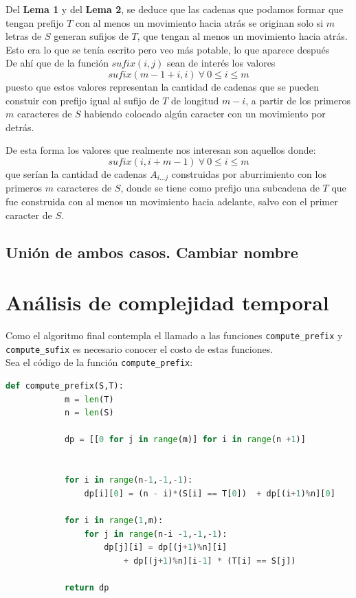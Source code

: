 \documentclass[a4paper]{article}
\begin{document}
	
	
	Del \textbf{Lema 1} y del \textbf{Lema 2}, se deduce que las cadenas que podamos formar que tengan prefijo $T$ con al menos un 
	movimiento hacia atr\'as se originan solo si $m$ letras de $S$ generan sufijos de $T$, que tengan al menos un movimiento hacia atr\'as. \\
	
	{\tiny
	Esto era lo que se tenía escrito pero veo más potable, lo que aparece después\\
	
	De ah\'i que de la funci\'on $sufix(i,j)$ sean de inter\'es los valores $$sufix(m -1 +i, i)~ \forall~0 \leq i \leq m$$ puesto que estos valores representan la cantidad
	de cadenas que se pueden constuir con prefijo igual al sufijo de $T$ de longitud $m-i$, a partir de los primeros $m$ caracteres de $S$ habiendo colocado alg\'un caracter con un
	movimiento por detr\'as.\\
	
}
	
	De esta forma los valores que realmente nos interesan son aquellos donde:
	$$sufix(i, i+m-1) ~ \forall~0 \leq i \leq m$$
	que serían la cantidad de cadenas $A_{i...j}$ construidas por aburrimiento con los primeros $m$ caracteres de $S$, donde se tiene como prefijo una subcadena de $T$ que fue construida con al menos un movimiento hacia adelante, salvo con el primer caracter de $S$.
	
	\subsection*{Unión de ambos casos. Cambiar nombre}
	
	
    
    \section*{An\'alisis de complejidad temporal}

    Como el algoritmo final contempla el llamado a las funciones \texttt{compute\_prefix} y \texttt{compute\_sufix}
    es necesario conocer el costo de estas funciones.\\ 

    Sea el c\'odigo de la funci\'on \texttt{compute\_prefix}: 

    \begin{lstlisting}[language=Python]
        def compute_prefix(S,T):
            m = len(T)
            n = len(S)

            dp = [[0 for j in range(m)] for i in range(n +1)]

    
            for i in range(n-1,-1,-1):
                dp[i][0] = (n - i)*(S[i] == T[0])  + dp[(i+1)%n][0] 

            for i in range(1,m):
                for j in range(n-i -1,-1,-1):
                    dp[j][i] = dp[(j+1)%n][i] 
                        + dp[(j+1)%n][i-1] * (T[i] == S[j])

            return dp
    \end{lstlisting}
\end{document}
